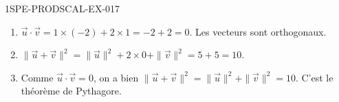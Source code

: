 \begin{corrige}{1SPE-PRODSCAL-EX-017}
\begin{enumerate}
\item $\vec{u} \cdot \vec{v} = 1 \times (-2) + 2 \times 1 = -2 + 2 = 0$. Les vecteurs sont orthogonaux.
\item $\|\vec{u} + \vec{v}\|^2 = \|\vec{u}\|^2 + 2 \times 0 + \|\vec{v}\|^2 = 5 + 5 = 10$.
\item Comme $\vec{u} \cdot \vec{v} = 0$, on a bien $\|\vec{u} + \vec{v}\|^2 = \|\vec{u}\|^2 + \|\vec{v}\|^2 = 10$. C'est le théorème de Pythagore.
\end{enumerate}
\end{corrige}
